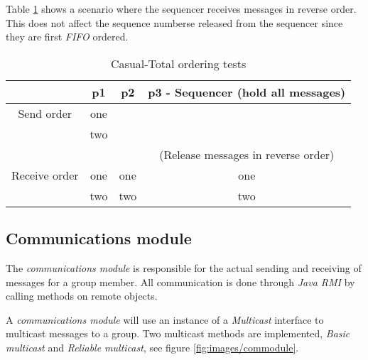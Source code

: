 \documentclass[titlepage, twocolumn, a4paper, 10pt]{article}
\begin{document}
Table \ref{tbl:castot} shows a scenario where the sequencer receives messages in reverse order. This does not affect the sequence numberse released from the sequencer since they are first \textit{FIFO} ordered.

\begin{table}[H]
  \centering
  \begin{footnotesize}
    \begin{tabular} {c | c | c | c}
      & p1 & p2 & p3 - Sequencer (hold all messages) \\
      \hline
      Send order & one &  &  \\
      & two &  &  \\
      \hline
      &  &  & (Release messages in reverse order) \\
      \hline
      Receive order & one & one & one \\
      & two & two & two \\
    \end{tabular}
  \end{footnotesize}
  \caption{Casual-Total ordering tests}
  \label{tbl:castot}
\end{table}
\begin{comment}
  #+ORGTBL: SEND casualtotal orgtbl-to-latex :splice t
  |               | p1  | p2  | p3 - Sequencer (hold all messages)  |
  |---------------+-----+-----+-------------------------------------|
  | Send order    | one |     |                                     |
  |               | two |     |                                     |
  |---------------+-----+-----+-------------------------------------|
  |               |     |     | (Release messages in reverse order) |
  |---------------+-----+-----+-------------------------------------|
  | Receive order | one | one | one                                 |
  |               | two | two | two                                 |
\end{comment}


\subsection{Communications module}\label{sec:communications-module}
The \textit{communications module} is responsible for the actual
sending and receiving of messages for a group member. All
communication is done through \textit{Java RMI} by calling methods on
remote objects.

A \textit{communications module} will use an instance of a
\textit{Multicast} interface to multicast messages to a group. Two
multicast methods are implemented, \textit{Basic multicast} and
\textit{Reliable multicast}, see figure \ref{fig:images/commodule}.
\end{document}
